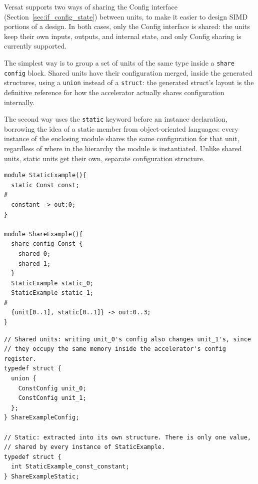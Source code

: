%

Versat supports two ways of sharing the Config interface (Section~\ref{sec:if_config_state})
between units, to make it easier to design SIMD portions of a design. In
both cases, only the Config interface is shared: the units keep their own
inputs, outputs, and internal state, and only Config sharing is currently
supported.

The simplest way is to group a set of units of the same type inside a
\texttt{share config} block. Shared units have their configuration merged,
inside the generated structures, using a \texttt{union} instead of a
\texttt{struct}: the generated struct's layout is the definitive reference
for how the accelerator actually shares configuration internally.

The second way uses the \texttt{static} keyword before an instance
declaration, borrowing the idea of a static member from object-oriented
languages: every instance of the enclosing module shares the same
configuration for that unit, regardless of where in the hierarchy the
module is instantiated. Unlike shared units, static units get their own,
separate configuration structure.

\begin{lstlisting}
module StaticExample(){
  static Const const;
#
  constant -> out:0;
}

module ShareExample(){
  share config Const {
    shared_0;
    shared_1;
  }
  StaticExample static_0;
  StaticExample static_1;
#
  {unit[0..1], static[0..1]} -> out:0..3;
}
\end{lstlisting}

\begin{lstlisting}
// Shared units: writing unit_0's config also changes unit_1's, since
// they occupy the same memory inside the accelerator's config register.
typedef struct {
  union {
    ConstConfig unit_0;
    ConstConfig unit_1;
  };
} ShareExampleConfig;

// Static: extracted into its own structure. There is only one value,
// shared by every instance of StaticExample.
typedef struct {
  int StaticExample_const_constant;
} ShareExampleStatic;
\end{lstlisting}
